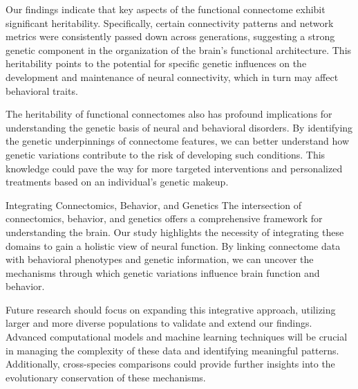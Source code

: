 Our findings indicate that key aspects of the functional connectome exhibit significant heritability. Specifically, certain connectivity patterns and network metrics were consistently passed down across generations, suggesting a strong genetic component in the organization of the brain's functional architecture. This heritability points to the potential for specific genetic influences on the development and maintenance of neural connectivity, which in turn may affect behavioral traits.

The heritability of functional connectomes also has profound implications for understanding the genetic basis of neural and behavioral disorders. By identifying the genetic underpinnings of connectome features, we can better understand how genetic variations contribute to the risk of developing such conditions. This knowledge could pave the way for more targeted interventions and personalized treatments based on an individual's genetic makeup.

Integrating Connectomics, Behavior, and Genetics
The intersection of connectomics, behavior, and genetics offers a comprehensive framework for understanding the brain. Our study highlights the necessity of integrating these domains to gain a holistic view of neural function. By linking connectome data with behavioral phenotypes and genetic information, we can uncover the mechanisms through which genetic variations influence brain function and behavior.

Future research should focus on expanding this integrative approach, utilizing larger and more diverse populations to validate and extend our findings. Advanced computational models and machine learning techniques will be crucial in managing the complexity of these data and identifying meaningful patterns. Additionally, cross-species comparisons could provide further insights into the evolutionary conservation of these mechanisms.